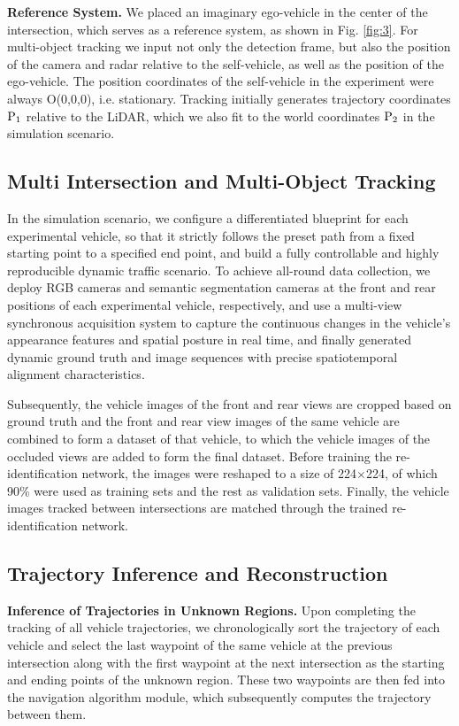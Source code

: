 \documentclass[journal,twoside,web]{ieeecolor}
\begin{document}
\textbf{Reference System.}
We placed an imaginary ego-vehicle in the center of the intersection, which serves as a reference system, as shown in Fig. \ref{fig:3}. 
For multi-object tracking we input not only the detection frame, but also the position of the camera and radar relative to the self-vehicle, as well as the position of the ego-vehicle. 
The position coordinates of the self-vehicle in the experiment were always O(0,0,0), i.e. stationary. 
Tracking initially generates trajectory coordinates \(\text P_1\) relative to the LiDAR, which we also fit to the world coordinates \(\text P_2\) in the simulation scenario.
\subsection{Multi Intersection and Multi-Object Tracking}

In the simulation scenario, we configure a differentiated blueprint for each experimental vehicle, so that it strictly follows the preset path from a fixed starting point to a specified end point, and build a fully controllable and highly reproducible dynamic traffic scenario.
To achieve all-round data collection, we deploy RGB cameras and semantic segmentation cameras at the front and rear positions of each experimental vehicle, respectively, and use a multi-view synchronous acquisition system to capture the continuous changes in the vehicle's appearance features and spatial posture in real time, and finally generated dynamic ground truth and image sequences with precise spatiotemporal alignment characteristics.

Subsequently, the vehicle images of the front and rear views are cropped based on ground truth and the front and rear view images of the same vehicle are combined to form a dataset of that vehicle, to which the vehicle images of the occluded views are added to form the final dataset.
Before training the re-identification network, the images were reshaped to a size of 224\(\times\)224, of which 90\% were used as training sets and the rest as validation sets.
Finally, the vehicle images tracked between intersections are matched through the trained re-identification network.


\subsection{Trajectory Inference and Reconstruction}

\textbf{Inference of Trajectories in Unknown Regions.}
Upon completing the tracking of all vehicle trajectories, we chronologically sort the trajectory of each vehicle and select the last waypoint of the same vehicle at the previous intersection along with the first waypoint at the next intersection as the starting and ending points of the unknown region. 
These two waypoints are then fed into the navigation algorithm module, which subsequently computes the trajectory between them.
\end{document}
